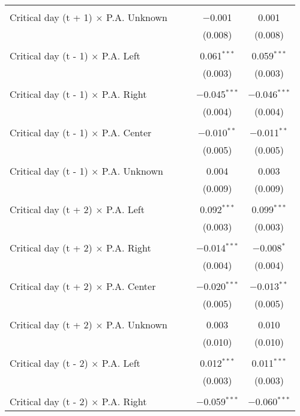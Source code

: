 \documentclass[
]{article}
\begin{document}
\begin{table}[!htbp]
{\begin{tabular}{@{\extracolsep{5pt}}lcccc}
  & & & & \\ 
 Critical day (t + 1) $\times$ P.A. Unknown &  &  & $-$0.001 & 0.001 \\ 
  &  &  & (0.008) & (0.008) \\ 
  & & & & \\ 
 Critical day (t - 1) $\times$ P.A. Left &  &  & 0.061$^{***}$ & 0.059$^{***}$ \\ 
  &  &  & (0.003) & (0.003) \\ 
  & & & & \\ 
 Critical day (t - 1) $\times$ P.A. Right &  &  & $-$0.045$^{***}$ & $-$0.046$^{***}$ \\ 
  &  &  & (0.004) & (0.004) \\ 
  & & & & \\ 
 Critical day (t - 1) $\times$ P.A. Center &  &  & $-$0.010$^{**}$ & $-$0.011$^{**}$ \\ 
  &  &  & (0.005) & (0.005) \\ 
  & & & & \\ 
 Critical day (t - 1) $\times$ P.A. Unknown &  &  & 0.004 & 0.003 \\ 
  &  &  & (0.009) & (0.009) \\ 
  & & & & \\ 
 Critical day (t + 2) $\times$ P.A. Left &  &  & 0.092$^{***}$ & 0.099$^{***}$ \\ 
  &  &  & (0.003) & (0.003) \\ 
  & & & & \\ 
 Critical day (t + 2) $\times$ P.A. Right &  &  & $-$0.014$^{***}$ & $-$0.008$^{*}$ \\ 
  &  &  & (0.004) & (0.004) \\ 
  & & & & \\ 
 Critical day (t + 2) $\times$ P.A. Center &  &  & $-$0.020$^{***}$ & $-$0.013$^{**}$ \\ 
  &  &  & (0.005) & (0.005) \\ 
  & & & & \\ 
 Critical day (t + 2) $\times$ P.A. Unknown &  &  & 0.003 & 0.010 \\ 
  &  &  & (0.010) & (0.010) \\ 
  & & & & \\ 
 Critical day (t - 2) $\times$ P.A. Left &  &  & 0.012$^{***}$ & 0.011$^{***}$ \\ 
  &  &  & (0.003) & (0.003) \\ 
  & & & & \\ 
 Critical day (t - 2) $\times$ P.A. Right &  &  & $-$0.059$^{***}$ & $-$0.060$^{***}$ \\ 

\end{tabular}}
\end{table}
\end{document}
